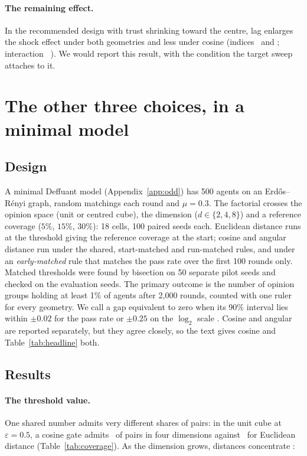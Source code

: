 \documentclass[11pt]{article}
\begin{document}
\paragraph{The remaining effect.}
In the recommended design with trust shrinking toward the centre, lag enlarges the shock effect under both geometries and less under cosine (indices \VCRecommendedEucIdx\ and \VCRecommendedCosIdx; interaction \VCRecommendedInter\ \VCRecommendedCI).
We would report this result, with the condition the target sweep attaches to it.

\section{The other three choices, in a minimal model}
\label{sec:minimal}

\subsection{Design}
A minimal Deffuant model (Appendix~\ref{app:odd}) has 500 agents on an Erd\H{o}s--R\'enyi graph, random matchings each round and $\mu = 0.3$.
The factorial crosses the opinion space (unit or centred cube), the dimension ($d \in \{2,4,8\}$) and a reference coverage ($5\%$, $15\%$, $30\%$): 18 cells, 100 paired seeds each.
Euclidean distance runs at the threshold giving the reference coverage at the start; cosine and angular distance run under the shared, start-matched and run-matched rules, and under an \emph{early-matched} rule that matches the pass rate over the first 100 rounds only.
Matched thresholds were found by bisection on 50 separate pilot seeds and checked on the evaluation seeds.
The primary outcome is the number of opinion groups holding at least 1\% of agents after 2{,}000 rounds, counted with one ruler for every geometry.
We call a gap equivalent to zero when its 90\% interval lies within $\pm0.02$ for the pass rate or $\pm0.25$ on the $\log_2$ scale \citep{lakens2017}.
Cosine and angular are reported separately, but they agree closely, so the text gives cosine and Table~\ref{tab:headline} both.

\subsection{Results}

\paragraph{The threshold value.}
One shared number admits very different shares of pairs: in the unit cube at $\varepsilon = 0.5$, a cosine gate admits \UnitFourCos\ of pairs in four dimensions against \UnitFourEuc\ for Euclidean distance (Table~\ref{tab:coverage}).
As the dimension grows, distances concentrate \citep{aggarwal2001}:
\end{document}
